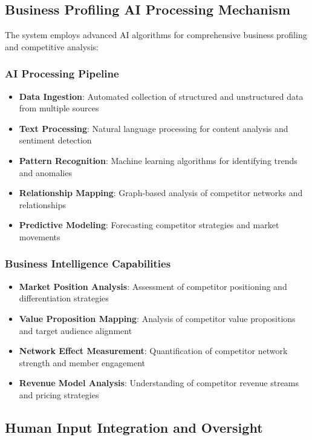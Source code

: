 \subsection{Business Profiling AI Processing Mechanism}

The system employs advanced AI algorithms for comprehensive business profiling and competitive analysis:

\subsubsection{AI Processing Pipeline}
\begin{itemize}
    \item \textbf{Data Ingestion}: Automated collection of structured and unstructured data from multiple sources
    \item \textbf{Text Processing}: Natural language processing for content analysis and sentiment detection
    \item \textbf{Pattern Recognition}: Machine learning algorithms for identifying trends and anomalies
    \item \textbf{Relationship Mapping}: Graph-based analysis of competitor networks and relationships
    \item \textbf{Predictive Modeling}: Forecasting competitor strategies and market movements
\end{itemize}

\subsubsection{Business Intelligence Capabilities}
\begin{itemize}
    \item \textbf{Market Position Analysis}: Assessment of competitor positioning and differentiation strategies
    \item \textbf{Value Proposition Mapping}: Analysis of competitor value propositions and target audience alignment
    \item \textbf{Network Effect Measurement}: Quantification of competitor network strength and member engagement
    \item \textbf{Revenue Model Analysis}: Understanding of competitor revenue streams and pricing strategies
\end{itemize}

\subsection{Human Input Integration and Oversight}

